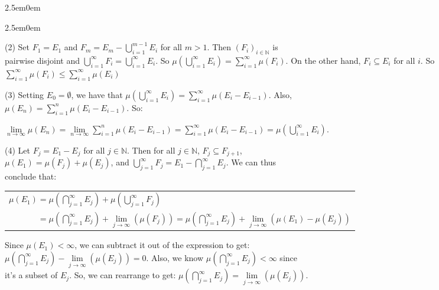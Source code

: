 \documentclass{book}
\newenvironment{myIndent}{%
   \begin{adjustwidth}{2.5em}{0em}%
}{%
   \end{adjustwidth}%
}
\newcommand{\myHS}{ \hspace{0.5em}}
\newcommand{\retTwo}{\hfill\bigbreak}
\begin{document}
\begin{myIndent}
\begin{enumerate}
\begin{myIndent}
         (2) Set $F_1 = E_1$ and $F_m = E_m - \bigcup\limits_{i=1}^{m-1}E_i$ for all $m > 1$. Then $(F_i)_{i \in \mathbb{N}}$ is\\ [-6pt] pairwise disjoint and $\bigcup\limits_{i=1}^\infty F_i = \bigcup\limits_{i=1}^\infty E_i$. So $\mu(\bigcup\limits_{i=1}^\infty E_i) = \sum\limits_{i=1}^\infty\mu(F_i)$. On the other hand, $F_i \subseteq E_i$ for all $i$. So $\sum\limits_{i=1}^\infty\mu(F_i) \leq \sum\limits_{i=1}^\infty\mu(E_i)$\retTwo\retTwo

         (3) Setting $E_0 = \emptyset$, we have that $\mu(\bigcup\limits_{i=1}^\infty E_i) = \sum\limits_{i=1}^\infty\mu(E_i - E_{i-1})$. Also,\\ [-6pt] $\mu(E_n) = \sum\limits_{i=1}^n\mu(E_i - E_{i-1})$. So:\\ [-8pt]
         
         {\centering$\lim\limits_{n \rightarrow \infty}{\mu(E_n)} = \lim\limits_{n \rightarrow \infty}{\sum\limits_{i=1}^n\mu(E_i - E_{i-1})} = \sum\limits_{i=1}^\infty \mu(E_i - E_{i-1}) = \mu(\bigcup\limits_{i=1}^\infty E_i)$.\retTwo\retTwo\par}

         (4) Let $F_j = E_1 - E_j$ for all $j \in \mathbb{N}$. Then for all $j \in \mathbb{N}$,\myHS $F_j \subseteq F_{j+1}$,\\ $\mu(E_1) = \mu(F_j) + \mu(E_j)$, and $\bigcup\limits_{j=1}^\infty F_j = E_1 - \bigcap\limits_{j = 1}^\infty E_j$. We can thus\\ conclude that:

         {\centering\begin{tabular}{l}
            $\mu(E_1) = \mu(\bigcap\limits_{j=1}^\infty E_j) + \mu(\bigcup\limits_{j=1}^\infty F_j)$\\ [6pt]
            $\phantom{\mu(E_1)} = \mu(\bigcap\limits_{j=1}^\infty E_j) + \lim\limits_{j \rightarrow \infty}(\mu(F_j)) = \mu(\bigcap\limits_{j=1}^\infty E_j) + \lim\limits_{j \rightarrow \infty}(\mu(E_1) - \mu(E_j))$
         \end{tabular} \retTwo\par}

         Since $\mu(E_1) < \infty$, we can subtract it out of the expression to get:\\ [4pt] $\mu(\bigcap\limits_{j=1}^\infty E_j) - \lim\limits_{j\rightarrow\infty}(\mu(E_j)) = 0$. Also, we know $\mu(\bigcap\limits_{j=1}^\infty E_j) < \infty$ since\\ [0pt] it's a subset of $E_j$. So, we can rearrange to get: $\mu(\bigcap\limits_{j=1}^\infty E_j) = \lim\limits_{j\rightarrow\infty}(\mu(E_j))$.
      \end{myIndent}
   \end{enumerate}
\end{myIndent}
\end{document}

